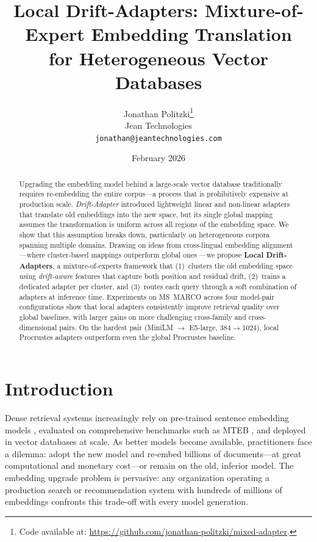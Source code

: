 \documentclass[11pt,a4paper]{article}
\title{Local Drift-Adapters: Mixture-of-Expert Embedding Translation\\for Heterogeneous Vector Databases}
\author{
  Jonathan Politzki\thanks{Code available at: \url{https://github.com/jonathan-politzki/mixed-adapter}.}\\
  Jean Technologies\\
  \texttt{jonathan@jeantechnologies.com}
}
\date{February 2026}
\begin{document}
\maketitle

\begin{abstract}
Upgrading the embedding model behind a large-scale vector database traditionally requires re-embedding the entire corpus---a process that is prohibitively expensive at production scale.
\emph{Drift-Adapter} \citep{vejendla2025drift} introduced lightweight linear and non-linear adapters that translate old embeddings into the new space, but its single global mapping assumes the transformation is uniform across all regions of the embedding space.
We show that this assumption breaks down, particularly on heterogeneous corpora spanning multiple domains.
Drawing on ideas from cross-lingual embedding alignment---where cluster-based mappings outperform global ones \citep{dan2020cluster,nakashole2018mapping}---we propose \textbf{Local Drift-Adapters}, a mixture-of-experts framework that (1)~clusters the old embedding space using \emph{drift-aware} features that capture both position and residual drift, (2)~trains a dedicated adapter per cluster, and (3)~routes each query through a soft combination of adapters at inference time.
Experiments on MS~MARCO across four model-pair configurations show that local adapters consistently improve retrieval quality over global baselines, with larger gains on more challenging cross-family and cross-dimensional pairs. On the hardest pair (MiniLM $\to$ E5-large, 384$\to$1024), local Procrustes adapters outperform even the global Procrustes baseline.
\end{abstract}

\section{Introduction}
\label{sec:intro}

Dense retrieval systems increasingly rely on pre-trained sentence embedding models \citep{reimers2019sentence,xiao2023bge}, evaluated on comprehensive benchmarks such as MTEB \citep{muennighoff2023mteb}, and deployed in vector databases at scale.
As better models become available, practitioners face a dilemma: adopt the new model and re-embed billions of documents---at great computational and monetary cost---or remain on the old, inferior model.
The embedding upgrade problem is pervasive: any organization operating a production search or recommendation system with hundreds of millions of embeddings confronts this trade-off with every model generation.
\end{document}

